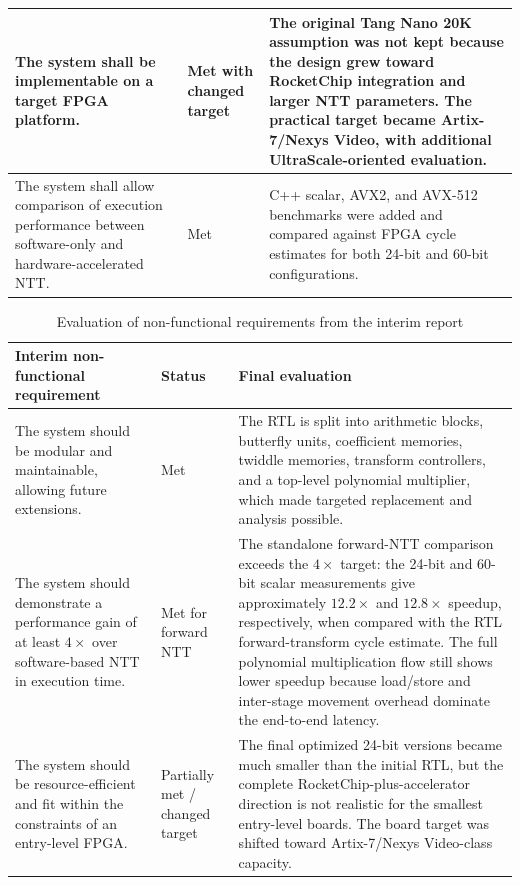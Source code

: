 \documentclass[a4paper, 12pt, titlepage]{article}
\begin{document}
\begin{table}[H]
\begin{tabularx}{\textwidth}{|>{\raggedright\arraybackslash}p{}|>{\centering\arraybackslash}p{}|>{\raggedright\arraybackslash}X|}
\hline
The system shall be implementable on a target FPGA platform. & Met with changed target & The original Tang Nano 20K assumption was not kept because the design grew toward RocketChip integration and larger NTT parameters. The practical target became Artix-7/Nexys Video, with additional UltraScale-oriented evaluation. \\
\hline
The system shall allow comparison of execution performance between software-only and hardware-accelerated NTT. & Met & C++ scalar, AVX2, and AVX-512 benchmarks were added and compared against FPGA cycle estimates for both 24-bit and 60-bit configurations. \\
\hline
\end{tabularx}
\end{table}

\begin{table}[H]
\centering
\scriptsize
\setlength{\tabcolsep}{3pt}
\renewcommand{\arraystretch}{1.05}
\caption{Evaluation of non-functional requirements from the interim report}
\label{tab:nonfunctional-requirements-eval}
\begin{tabularx}{\textwidth}{|>{\raggedright\arraybackslash}p{}|>{\centering\arraybackslash}p{}|>{\raggedright\arraybackslash}X|}
\hline
Interim non-functional requirement & Status & Final evaluation \\
\hline
The system should be modular and maintainable, allowing future extensions. & Met & The RTL is split into arithmetic blocks, butterfly units, coefficient memories, twiddle memories, transform controllers, and a top-level polynomial multiplier, which made targeted replacement and analysis possible. \\
\hline
The system should demonstrate a performance gain of at least \(4\times\) over software-based NTT in execution time. & Met for forward NTT & The standalone forward-NTT comparison exceeds the \(4\times\) target: the 24-bit and 60-bit scalar measurements give approximately \(12.2\times\) and \(12.8\times\) speedup, respectively, when compared with the RTL forward-transform cycle estimate. The full polynomial multiplication flow still shows lower speedup because load/store and inter-stage movement overhead dominate the end-to-end latency. \\
\hline
The system should be resource-efficient and fit within the constraints of an entry-level FPGA. & Partially met / changed target & The final optimized 24-bit versions became much smaller than the initial RTL, but the complete RocketChip-plus-accelerator direction is not realistic for the smallest entry-level boards. The board target was shifted toward Artix-7/Nexys Video-class capacity. \\

\end{tabularx}
\end{table}
\end{document}
